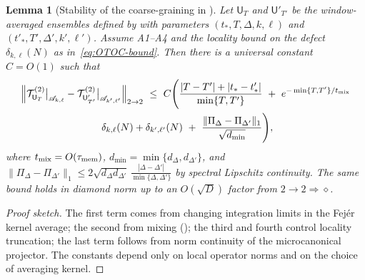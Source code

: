 \documentclass[aps,prd,preprint,onecolumn,superscriptaddress,nofootinbib,longbibliography,floatfix,11pt,showpacs,showkeys]{revtex4-2}
\theoremstyle{plain}
\newtheorem{lemma}[theorem]{Lemma}
\theoremstyle{definition}
\theoremstyle{remark}
\begin{document}
\begin{lemma}[Stability of the coarse-graining in ]\label{lem:CG-stability}
Let $\mathsf{U}_T$ and $\mathsf{U}'_{T'}$ be the window-averaged ensembles defined by  with parameters
$(t_\ast,T,\Delta,k,\ell)$ and $(t'_\ast,T',\Delta',k',\ell')$. Assume A1--A4 and the locality bound on the defect $\delta_{k,\ell}(N)$
as in~\eqref{eq:OTOC-bound}. Then there is a universal constant $C=O(1)$ such that
\begin{multline}
\left\| \mathcal{T}^{(2)}_{\mathsf{U}_T}\big|_{\mathscr{A}_{k,\ell}} - \mathcal{T}^{(2)}_{\mathsf{U}'_{T'}}\big|_{\mathscr{A}_{k',\ell'}} \right\|_{2\to 2} 
\ \le\ C\Bigg(\frac{|T-T'|+|t_\ast-t'_\ast|}{\min\{T,T'\}} \ +\ e^{-\min\{T,T'\}/t_{\rm mix}} \\
\ \delta_{k,\ell}(N)+\delta_{k',\ell'}(N)\ +\ \frac{\|\Pi_\Delta-\Pi_{\Delta'}\|_1}{\sqrt{d_{\min}}}\Bigg),
\label{eq:CG-stability}
\end{multline}
where $t_{\rm mix}=O(\tau_{\rm mem})$, $d_{\min}=\min\{d_\Delta,d_{\Delta'}\}$, and $\|\Pi_\Delta-\Pi_{\Delta'}\|_1\le 2\sqrt{d_\Delta d_{\Delta'}}\,\frac{|\Delta-\Delta'|}{\min\{\Delta,\Delta'\}}$ by spectral
Lipschitz continuity. The same bound holds in diamond norm up to an $O(\sqrt{D})$ factor from $2{\to}2\Rightarrow\diamond$.
\end{lemma}
\begin{proof}[Proof sketch]
The first term comes from changing integration limits in the Fej\'er kernel average; the second from mixing ();
the third and fourth control locality truncation; the last term follows from norm continuity of the microcanonical projector.
The constants depend only on local operator norms and on the choice of averaging kernel.
\end{proof}
\end{document}

